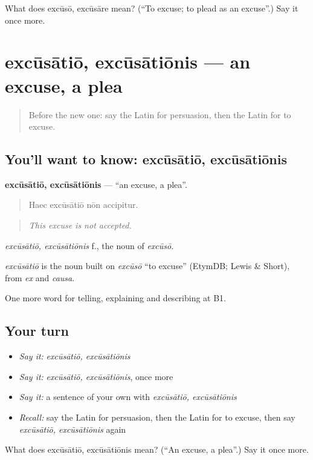 \begin{tcolorbox}[breakable,colback=teal!4,colframe=teal!35!black,title={Before you move on}]
What does excūsō, excūsāre mean? (\textquotedblleft{}To excuse; to plead as an excuse\textquotedblright{}.) Say it once more.
\end{tcolorbox}
\section[excūsātiō, excūsātiōnis]{excūsātiō, excūsātiōnis — an excuse, a plea}

\label{lesson:LA-C369-excusatio}



\begin{quote}
Before the new one: say the Latin for persuasion, then the Latin for to excuse.
\end{quote}

\subsection*{You'll want to know: excūsātiō, excūsātiōnis}
\textbf{excūsātiō, excūsātiōnis} — \textquotedblleft{}an excuse, a plea\textquotedblright{}.

\begin{quote}
Haec excūsātiō nōn accipitur.
\end{quote}

\begin{quote}
\emph{This excuse is not accepted.}
\end{quote}

\emph{excūsātiō, excūsātiōnis} f., the noun of \emph{excūsō}.

\begin{cousinweb}
\emph{excūsātiō} is the noun built on \emph{excūsō} \textquotedblleft{}to excuse\textquotedblright{} (EtymDB; Lewis \& Short), from \emph{ex} and \emph{causa}.
\end{cousinweb}

\begin{grammarlens}[title={What you've built}]
One more word for telling, explaining and describing at B1.
\end{grammarlens}

\subsection*{Your turn}
\begin{itemize}
\raggedright
  \item \emph{Say it:} \emph{excūsātiō, excūsātiōnis}
  \item \emph{Say it:} \emph{excūsātiō, excūsātiōnis}, once more
  \item \emph{Say it:} a sentence of your own with \emph{excūsātiō, excūsātiōnis}
  \item \emph{Recall:} say the Latin for persuasion, then the Latin for to excuse, then say \emph{excūsātiō, excūsātiōnis} again
\end{itemize}

\begin{tcolorbox}[breakable,colback=teal!4,colframe=teal!35!black,title={Before you move on}]
What does excūsātiō, excūsātiōnis mean? (\textquotedblleft{}An excuse, a plea\textquotedblright{}.) Say it once more.
\end{tcolorbox}

